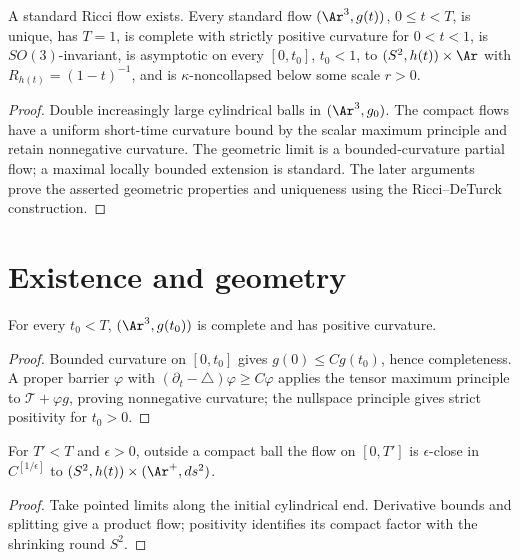 \begin{theorem}
\label{thm:standard-solution-existence-uniqueness}
\label{stdsoln}
A standard Ricci flow exists. Every standard flow $(\Ar^3,g(t))$, $0\le t<T$,
is unique, has $T=1$, is complete with strictly positive curvature for
$0<t<1$, is $SO(3)$-invariant, is asymptotic on every $[0,t_0]$, $t_0<1$,
to $(S^2,h(t))\times\Ar$ with $R_{h(t)}=(1-t)^{-1}$, and is
$\kappa$-noncollapsed below some scale $r>0$.
\end{theorem}
\begin{proof}
\sketch Double increasingly large cylindrical balls in $(\Ar^3,g_0)$.
The compact flows have a uniform short-time curvature bound by the scalar
maximum principle and retain nonnegative curvature. The geometric limit is
a bounded-curvature partial flow; a maximal locally bounded extension is
standard. The later arguments prove the asserted geometric properties and
uniqueness using the Ricci--DeTurck construction.
\end{proof}

\section{Existence and geometry}

\begin{lemma}
\label{lem:standard-flow-complete-positive-curvature}
\label{third}
For every $t_0<T$, $(\Ar^3,g(t_0))$ is complete and has positive curvature.
\end{lemma}
\begin{proof}
\sketch Bounded curvature on $[0,t_0]$ gives $g(0)\le Cg(t_0)$, hence
completeness. A proper barrier $\varphi$ with
$(\partial_t-\triangle)\varphi\ge C\varphi$ applies the tensor maximum
principle to $\mathcal T+\varphi g$, proving nonnegative curvature;
the nullspace principle gives strict positivity for $t_0>0$.
\end{proof}

\begin{proposition}
\label{prop:standard-flow-asymptotic-cylinder}
\label{item5}
For $T'<T$ and $\epsilon>0$, outside a compact ball the flow on
$[0,T']$ is $\epsilon$-close in $C^{[1/\epsilon]}$ to
$(S^2,h(t))\times(\Ar^+,ds^2)$.
\end{proposition}
\begin{proof}
\sketch Take pointed limits along the initial cylindrical end. Derivative
bounds and splitting give a product flow; positivity identifies its compact
factor with the shrinking round $S^2$.
\end{proof}

